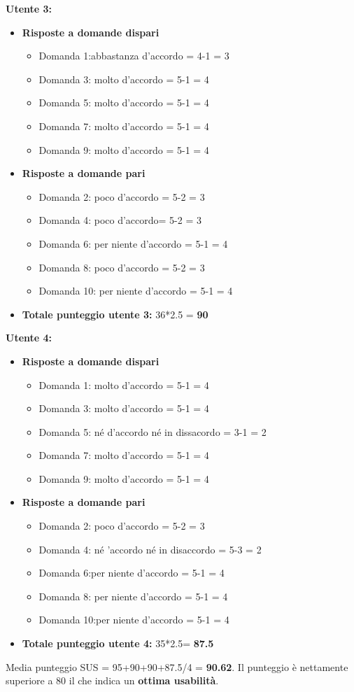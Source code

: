 \textbf{Utente 3:}
\begin{itemize}
    \item \textbf{Risposte a domande dispari}
    \begin{itemize}
        \item Domanda 1:abbastanza d'accordo = 4-1 = 3
        \item Domanda 3: molto d'accordo = 5-1 = 4
        \item Domanda 5: molto d'accordo = 5-1 = 4
        \item Domanda 7: molto d'accordo = 5-1 = 4
        \item Domanda 9: molto d'accordo = 5-1 = 4
    \end{itemize}
    \item \textbf{Risposte a domande pari}
    \begin{itemize}
        \item Domanda 2: poco d'accordo = 5-2 = 3
        \item Domanda 4: poco d'accordo= 5-2 = 3
        \item Domanda 6: per niente d'accordo = 5-1 = 4
        \item Domanda 8: poco d'accordo = 5-2 = 3
        \item Domanda 10: per niente d'accordo = 5-1 = 4
    \end{itemize}

    \item \textbf{Totale punteggio utente 3: } 36*2.5 = \textbf{90}
    
\end{itemize}
\textbf{Utente 4:}
\begin{itemize}
    \item \textbf{Risposte a domande dispari}
    \begin{itemize}
        \item Domanda 1: molto d'accordo = 5-1 = 4
        \item Domanda 3: molto d'accordo = 5-1 = 4
        \item Domanda 5: né d'accordo né in dissacordo = 3-1 = 2
        \item Domanda 7: molto d'accordo = 5-1 = 4
        \item Domanda 9: molto d'accordo = 5-1 = 4
    \end{itemize}
    \item \textbf{Risposte a domande pari}
    \begin{itemize}
        \item Domanda 2: poco d'accordo = 5-2 = 3
        \item Domanda 4: né 'accordo né in disaccordo = 5-3 = 2
        \item Domanda 6:per niente d'accordo = 5-1 = 4
        \item Domanda 8: per niente d'accordo = 5-1 = 4
        \item Domanda 10:per niente d'accordo = 5-1 = 4
    \end{itemize}

    \item \textbf{Totale punteggio utente 4: } 35*2.5= \textbf{87.5}
    
\end{itemize}
Media punteggio SUS = 95+90+90+87.5/4 = \textbf{90.62}. Il punteggio è nettamente superiore a 80 il che indica un \textbf{ottima usabilità}.